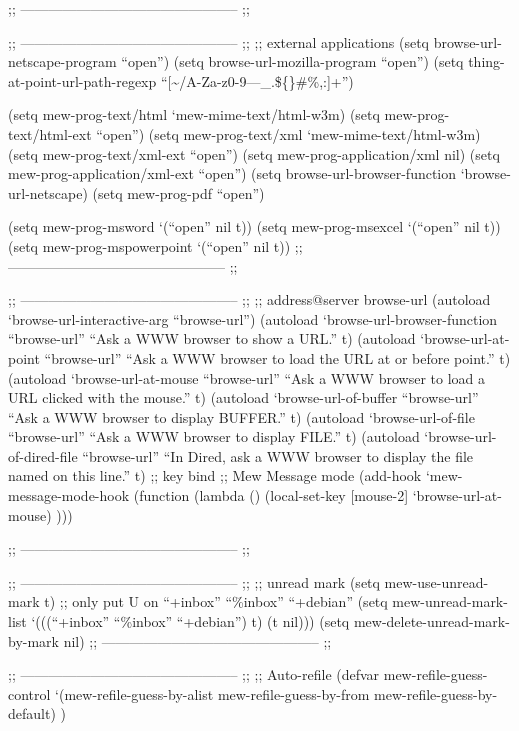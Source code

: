 \documentclass[11pt]{article}
\begin{document}
;; ----------------------------------------------- ;;


;; ----------------------------------------------- ;;
;; external applications
(setq browse-url-netscape-program ``open'')
(setq browse-url-mozilla-program ``open'')
(setq thing-at-point-url-path-regexp ``[\~{}/A-Za-z0-9---_.\$\{\}\#\%,:]+'')

(setq mew-prog-text/html         `mew-mime-text/html-w3m) 
(setq mew-prog-text/html-ext    ``open'')
(setq mew-prog-text/xml         `mew-mime-text/html-w3m) 
(setq mew-prog-text/xml-ext     ``open'')
(setq mew-prog-application/xml         nil)
(setq mew-prog-application/xml-ext     ``open'')
(setq browse-url-browser-function `browse-url-netscape)
(setq mew-prog-pdf             ``open'')

(setq mew-prog-msword `(``open'' nil t))
(setq mew-prog-msexcel `(``open'' nil t))
(setq mew-prog-mspowerpoint `(``open'' nil t))
;; ----------------------------------------------- ;;


;; ----------------------------------------------- ;;
;; address@server browse-url
(autoload `browse-url-interactive-arg ``browse-url'')
(autoload `browse-url-browser-function ``browse-url''
  ``Ask a WWW browser to show a URL.'' t)
(autoload `browse-url-at-point ``browse-url''
  ``Ask a WWW browser to load the URL at or before point.'' t)
(autoload `browse-url-at-mouse ``browse-url''
  ``Ask a WWW browser to load a URL clicked with the mouse.'' t)
(autoload `browse-url-of-buffer ``browse-url''
  ``Ask a WWW browser to display BUFFER.'' t)
(autoload `browse-url-of-file ``browse-url''
  ``Ask a WWW browser to display FILE.'' t)
(autoload `browse-url-of-dired-file ``browse-url''
  ``In Dired, ask a WWW browser to display the file named on this line.'' t)
;; key bind
;;  Mew Message mode
(add-hook `mew-message-mode-hook
          (function
           (lambda ()
            (local-set-key [mouse-2] `browse-url-at-mouse)
            )))

;; ----------------------------------------------- ;;


;; ----------------------------------------------- ;;
;; unread mark
(setq mew-use-unread-mark t)  
;; only put U on ``+inbox'' ``\%inbox'' ``+debian''
(setq mew-unread-mark-list
      `(((``+inbox'' ``\%inbox'' ``+debian'') t)
        (t nil)))
(setq mew-delete-unread-mark-by-mark nil)
;; ----------------------------------------------- ;;



;; ----------------------------------------------- ;;
;; Auto-refile
(defvar mew-refile-guess-control
  `(mew-refile-guess-by-alist
    mew-refile-guess-by-from
    mew-refile-guess-by-default)
  )
\end{document}

